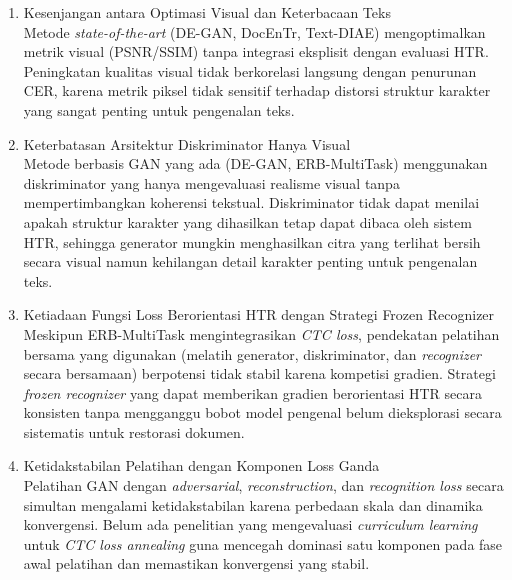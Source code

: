 \documentclass[12pt,a4paper]{book}
\begin{document}
\begin{enumerate}[label=\arabic*., leftmargin=0.5cm]
    \item Kesenjangan antara Optimasi Visual dan Keterbacaan Teks \\
    Metode \textit{state-of-the-art} (DE-GAN, DocEnTr, Text-DIAE) mengoptimalkan metrik visual (PSNR/SSIM) tanpa integrasi eksplisit dengan evaluasi HTR. Peningkatan kualitas visual tidak berkorelasi langsung dengan penurunan CER, karena metrik piksel tidak sensitif terhadap distorsi struktur karakter yang sangat penting untuk pengenalan teks.

    \item Keterbatasan Arsitektur Diskriminator Hanya Visual \\
    Metode berbasis GAN yang ada (DE-GAN, ERB-MultiTask) menggunakan diskriminator yang hanya mengevaluasi realisme visual tanpa mempertimbangkan koherensi tekstual. Diskriminator tidak dapat menilai apakah struktur karakter yang dihasilkan tetap dapat dibaca oleh sistem HTR, sehingga generator mungkin menghasilkan citra yang terlihat bersih secara visual namun kehilangan detail karakter penting untuk pengenalan teks.

    \item Ketiadaan Fungsi Loss Berorientasi HTR dengan Strategi Frozen Recognizer \\
    Meskipun ERB-MultiTask mengintegrasikan \textit{CTC loss}, pendekatan pelatihan bersama yang digunakan (melatih generator, diskriminator, dan \textit{recognizer} secara bersamaan) berpotensi tidak stabil karena kompetisi gradien. Strategi \textit{frozen recognizer} yang dapat memberikan gradien berorientasi HTR secara konsisten tanpa mengganggu bobot model pengenal belum dieksplorasi secara sistematis untuk restorasi dokumen.

    \item Ketidakstabilan Pelatihan dengan Komponen Loss Ganda \\
    Pelatihan GAN dengan \textit{adversarial}, \textit{reconstruction}, dan \textit{recognition loss} secara simultan mengalami ketidakstabilan karena perbedaan skala dan dinamika konvergensi. Belum ada penelitian yang mengevaluasi \textit{curriculum learning} untuk \textit{CTC loss annealing} guna mencegah dominasi satu komponen pada fase awal pelatihan dan memastikan konvergensi yang stabil.

\end{enumerate}
\end{document}
